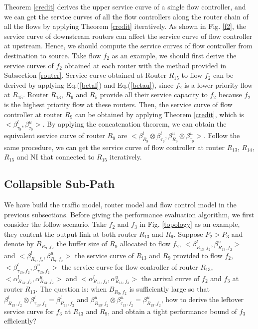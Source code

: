 \documentclass[10pt,journal]{IEEEtran}
\begin{document}
Theorem \ref{credit} derives the upper service curve of a single flow controller, and we can get the service curves of all the flow controllers along the router chain of all the flows by applying Theorem \ref{credit} iteratively. As shown in Fig. \ref{f2}, the service curve of downstream routers can affect the service curve of flow controller at upstream. Hence, we should compute the service curves of flow controller from destination to source. Take flow $f_2$ as an example, we should first derive the service curves of $f_2$ obtained at each router with the method provided in Subsection \ref{router}. Service curve obtained at Router $R_{15}$ to flow $f_2$ can be derived by applying Eq.(\ref{betal}) and Eq.(\ref{betau}), since $f_2$ is a lower priority flow at $R_{15}$. Router $R_{13}$, $R_{9}$ and $R_{5}$ provide all their service capacity to $f_2$ because $f_2$ is the highest priority flow at these routers. Then, the service curve of flow controller at router $R_{9}$ can be obtained by applying Theorem \ref{credit}, which is $<\beta_{\tau_9}^l,\beta_{\tau_9}^u>$. By applying the concatenation theorem, we can obtain the equivalent service curve of router $R_{9}$ are $<\beta_{R_9}^l\otimes\beta_{\tau_9}^l,\beta_{R_9}^u\otimes\beta_{\tau_9}^u>$. Follow the same procedure, we can get the service curve of flow controller at router $R_{13}$, $R_{14}$, $R_{15}$ and NI that connected to $R_{15}$ iteratively.

\subsection{Collapsible Sub-Path}\label{csp}
We have build the traffic model, router model and flow control model in the previous subsections. Before giving the performance evaluation algorithm, we first consider the follow scenario. Take $f_2$ and $f_3$ in Fig. \ref{topology} as an example, they content the output link at both router $R_{13}$ and $R_{9}$. Suppose $P_2>P_3$ and denote by $B_{R_9,f_2}$ the buffer size of $R_{9}$ allocated to flow $f_2$, $<\beta_{R_{13},f_2}^l,\beta_{R_{13},f_2}^u>$ and $<\beta_{R_{9},f_2}^l,\beta_{R_{9},f_2}^u>$ the service curve of $R_{13}$ and $R_{9}$ provided to flow $f_2$, $<\beta_{\tau_{13},f_2}^l,\beta_{\tau_{13},f_2}^u>$ the service curve for flow controller of router $R_{13}$, $<\alpha_{R_{13},f_2}^l,\alpha_{R_{13},f_2}^u>$ and $<\alpha_{R_{13},f_3}^l,\alpha_{R_{13},f_3}^u>$ the arrival curve of $f_2$ and $f_3$ at router $R_{13}$. The question is: when $B_{R_9,f_2}$ is sufficiently large so that $\beta_{R_{13},f_2}^l\otimes\beta_{\tau_{13},f_2}^l=\beta_{R_{13},f_2}^l$ and $\beta_{R_{13},f_2}^u\otimes\beta_{\tau_{13},f_2}^u=\beta_{R_{13},f_2}^u$, how to derive the leftover service curve for $f_3$ at $R_{13}$ and $R_9$, and obtain a tight performance bound of $f_3$ efficiently?
\end{document}

